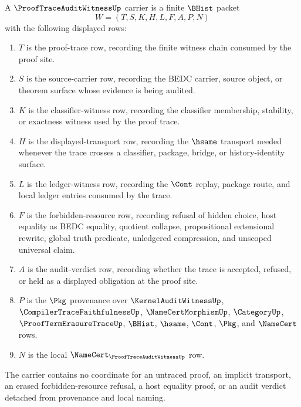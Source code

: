 \begin{definition}
\label{def:proof-trace-audit-witness-carrier}
A $\ProofTraceAuditWitnessUp$ carrier is a finite $\BHist$ packet
$$
W=(T,S,K,H,L,F,A,P,N)
$$
with the following displayed rows:
\begin{enumerate}
\item $T$ is the proof-trace row, recording the finite witness chain consumed by the proof site.
\item $S$ is the source-carrier row, recording the BEDC carrier, source object, or theorem surface whose evidence is being audited.
\item $K$ is the classifier-witness row, recording the classifier membership, stability, or exactness witness used by the proof trace.
\item $H$ is the displayed-transport row, recording the $\hsame$ transport needed whenever the trace crosses a classifier, package, bridge, or history-identity surface.
\item $L$ is the ledger-witness row, recording the $\Cont$ replay, package route, and local ledger entries consumed by the trace.
\item $F$ is the forbidden-resource row, recording refusal of hidden choice, host equality as BEDC equality, quotient collapse, propositional extensional rewrite, global truth predicate, unledgered compression, and unscoped universal claim.
\item $A$ is the audit-verdict row, recording whether the trace is accepted, refused, or held as a displayed obligation at the proof site.
\item $P$ is the $\Pkg$ provenance over $\KernelAuditWitnessUp$, $\CompilerTraceFaithfulnessUp$, $\NameCertMorphismUp$, $\CategoryUp$, $\ProofTermErasureTraceUp$, $\BHist$, $\hsame$, $\Cont$, $\Pkg$, and $\NameCert$ rows.
\item $N$ is the local $\NameCert_{\ProofTraceAuditWitnessUp}$ row.
\end{enumerate}
The carrier contains no coordinate for an untraced proof, an implicit transport, an erased forbidden-resource refusal, a host equality proof, or an audit verdict detached from provenance and local naming.
\end{definition}

